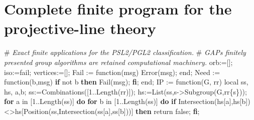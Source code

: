 \documentclass[
  11pt,
  a4paper,
]{article}
\author{}
\date{}
\newenvironment{Shaded}{}{}
\newcommand{\BuiltInTok}[1]{\textcolor[rgb]{0.00,0.50,0.00}{#1}}
\newcommand{\CommentTok}[1]{\textcolor[rgb]{0.38,0.63,0.69}{\textit{#1}}}
\newcommand{\ConstantTok}[1]{\textcolor[rgb]{0.53,0.00,0.00}{#1}}
\newcommand{\ControlFlowTok}[1]{\textcolor[rgb]{0.00,0.44,0.13}{\textbf{#1}}}
\newcommand{\ExtensionTok}[1]{#1}
\newcommand{\FloatTok}[1]{\textcolor[rgb]{0.25,0.63,0.44}{#1}}
\newcommand{\FunctionTok}[1]{\textcolor[rgb]{0.02,0.16,0.49}{#1}}
\newcommand{\NormalTok}[1]{#1}
\newcommand{\OperatorTok}[1]{\textcolor[rgb]{0.40,0.40,0.40}{#1}}
\newcommand{\VariableTok}[1]{\textcolor[rgb]{0.10,0.09,0.49}{#1}}
\begin{document}
\section{Complete finite program for the projective-line
theory}\label{complete-finite-program-for-the-projective-line-theory}

\begin{Shaded}
\begin{Highlighting}[]
\NormalTok{\#}\CommentTok{ Exact finite applications for the PSL2/PGL2 classification.}
\NormalTok{\#}\CommentTok{ GAP\textquotesingle{}s finitely presented group algorithms are retained computational machinery.}
\VariableTok{orb}\OperatorTok{:=}\NormalTok{[]}\OperatorTok{;} \VariableTok{iso}\OperatorTok{:=}\ConstantTok{fail}\OperatorTok{;} \VariableTok{vertices}\OperatorTok{:=}\NormalTok{[]}\OperatorTok{;}
\VariableTok{Fail} \OperatorTok{:=} \FunctionTok{function}\NormalTok{(}\VariableTok{msg}\NormalTok{) }\BuiltInTok{Error}\NormalTok{(}\VariableTok{msg}\NormalTok{)}\OperatorTok{;} \FunctionTok{end}\OperatorTok{;}
\VariableTok{Need} \OperatorTok{:=} \FunctionTok{function}\NormalTok{(}\VariableTok{b}\OperatorTok{,}\VariableTok{msg}\NormalTok{) }\ControlFlowTok{if} \ConstantTok{not} \VariableTok{b} \ControlFlowTok{then} \VariableTok{Fail}\NormalTok{(}\VariableTok{msg}\NormalTok{)}\OperatorTok{;} \ControlFlowTok{fi}\OperatorTok{;} \FunctionTok{end}\OperatorTok{;}
\VariableTok{IP} \OperatorTok{:=} \FunctionTok{function}\NormalTok{(}\VariableTok{G}\OperatorTok{,} \VariableTok{rr}\NormalTok{)}
  \ExtensionTok{local} \VariableTok{ss}\OperatorTok{,} \VariableTok{hs}\OperatorTok{,} \VariableTok{a}\OperatorTok{,}\VariableTok{b}\OperatorTok{;}
  \VariableTok{ss}\OperatorTok{:=}\BuiltInTok{Combinations}\NormalTok{([}\FloatTok{1}\OperatorTok{..}\BuiltInTok{Length}\NormalTok{(}\VariableTok{rr}\NormalTok{)])}\OperatorTok{;}
  \VariableTok{hs}\OperatorTok{:=}\BuiltInTok{List}\NormalTok{(}\VariableTok{ss}\OperatorTok{,}\VariableTok{s}\OperatorTok{{-}\textgreater{}}\BuiltInTok{Subgroup}\NormalTok{(}\VariableTok{G}\OperatorTok{,}\VariableTok{rr}\NormalTok{\{}\VariableTok{s}\NormalTok{\}))}\OperatorTok{;}
  \ControlFlowTok{for} \VariableTok{a} \ExtensionTok{in}\NormalTok{ [}\FloatTok{1}\OperatorTok{..}\BuiltInTok{Length}\NormalTok{(}\VariableTok{ss}\NormalTok{)] }\ControlFlowTok{do} \ControlFlowTok{for} \VariableTok{b} \ExtensionTok{in}\NormalTok{ [}\FloatTok{1}\OperatorTok{..}\BuiltInTok{Length}\NormalTok{(}\VariableTok{ss}\NormalTok{)] }\ControlFlowTok{do}
    \ControlFlowTok{if} \BuiltInTok{Intersection}\NormalTok{(}\VariableTok{hs}\NormalTok{[}\VariableTok{a}\NormalTok{]}\OperatorTok{,}\VariableTok{hs}\NormalTok{[}\VariableTok{b}\NormalTok{])}\OperatorTok{\textless{}\textgreater{}}\VariableTok{hs}\NormalTok{[}\BuiltInTok{Position}\NormalTok{(}\VariableTok{ss}\OperatorTok{,}\BuiltInTok{Intersection}\NormalTok{(}\VariableTok{ss}\NormalTok{[}\VariableTok{a}\NormalTok{]}\OperatorTok{,}\VariableTok{ss}\NormalTok{[}\VariableTok{b}\NormalTok{]))] }\ControlFlowTok{then} \ExtensionTok{return} \ConstantTok{false}\OperatorTok{;} \ControlFlowTok{fi}\OperatorTok{;}

\end{Highlighting}
\end{Shaded}
\end{document}
